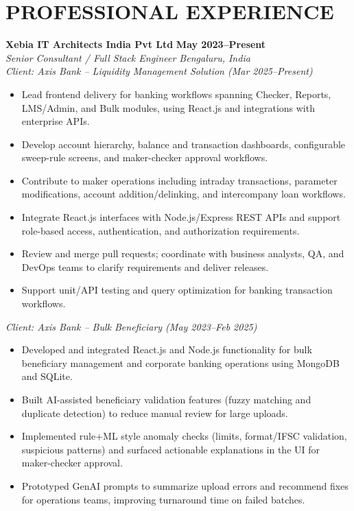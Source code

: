 \documentclass[10pt,a4paper]{article}
\begin{document}
\section*{PROFESSIONAL EXPERIENCE}
\textbf{Xebia IT Architects India Pvt Ltd} \hfill \textbf{May 2023--Present}\\
\textit{Senior Consultant / Full Stack Engineer \textbar{} Bengaluru, India}\\[-1pt]
\textit{Client: Axis Bank -- Liquidity Management Solution (Mar 2025--Present)}
\begin{itemize}
  \item Lead frontend delivery for banking workflows spanning Checker, Reports, LMS/Admin, and Bulk modules, using React.js and integrations with enterprise APIs.
  \item Develop account hierarchy, balance and transaction dashboards, configurable sweep-rule screens, and maker-checker approval workflows.
  \item Contribute to maker operations including intraday transactions, parameter modifications, account addition/delinking, and intercompany loan workflows.
  \item Integrate React.js interfaces with Node.js/Express REST APIs and support role-based access, authentication, and authorization requirements.
  \item Review and merge pull requests; coordinate with business analysts, QA, and DevOps teams to clarify requirements and deliver releases.
  \item Support unit/API testing and query optimization for banking transaction workflows. %
\end{itemize}
\textit{Client: Axis Bank -- Bulk Beneficiary (May 2023--Feb 2025)}
\begin{itemize}
  \item Developed and integrated React.js and Node.js functionality for bulk beneficiary management and corporate banking operations using MongoDB and SQLite.
  \item Built AI-assisted beneficiary validation features (fuzzy matching and duplicate detection) to reduce manual review for large uploads.
  \item Implemented rule+ML style anomaly checks (limits, format/IFSC validation, suspicious patterns) and surfaced actionable explanations in the UI for maker-checker approval.
  \item Prototyped GenAI prompts to summarize upload errors and recommend fixes for operations teams, improving turnaround time on failed batches.
\end{itemize}
\end{document}
